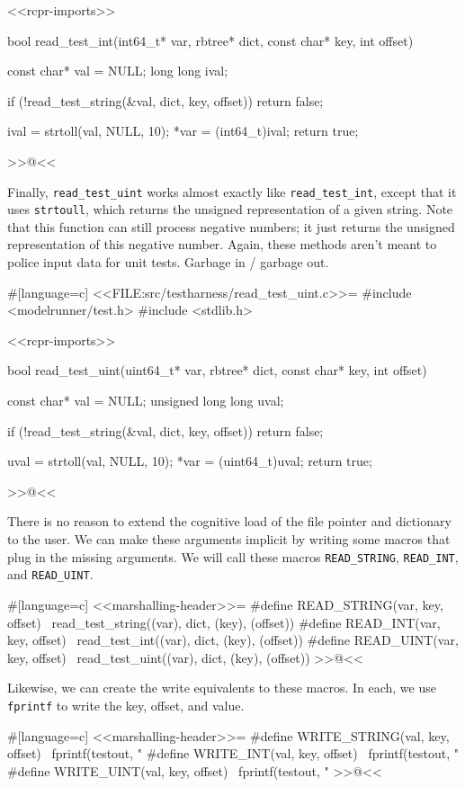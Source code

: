 {<<rcpr-imports>>

bool read_test_int(int64_t* var, rbtree* dict, const char* key, int offset)
{
    const char* val = NULL;
    long long ival;

    if (!read_test_string(&val, dict, key, offset))
    {
        return false;
    }

    ival = strtoll(val, NULL, 10);
    *var = (int64_t)ival;
    return true;
}
>>@<<

Finally, \verb/read_test_uint/ works almost exactly like \verb/read_test_int/,
except that it uses \verb/strtoull/, which returns the unsigned representation
of a given string. Note that this function can still process negative numbers;
it just returns the unsigned representation of this negative number. Again,
these methods aren't meant to police input data for unit tests. Garbage in /
garbage out.

#[language=c]
<<FILE:src/testharness/read_test_uint.c>>=
#include <modelrunner/test.h>
#include <stdlib.h>

<<rcpr-imports>>

bool read_test_uint(uint64_t* var, rbtree* dict, const char* key, int offset)
{
    const char* val = NULL;
    unsigned long long uval;

    if (!read_test_string(&val, dict, key, offset))
    {
        return false;
    }

    uval = strtoll(val, NULL, 10);
    *var = (uint64_t)uval;
    return true;
}
>>@<<

\newpage

There is no reason to extend the cognitive load of the file pointer and
dictionary to the user. We can make these arguments implicit by writing some
macros that plug in the missing arguments. We will call these macros
\verb/READ_STRING/, \verb/READ_INT/, and \verb/READ_UINT/.

#[language=c]
<<marshalling-header>>=
#define READ_STRING(var, key, offset) \
    read_test_string((var), dict, (key), (offset))
#define READ_INT(var, key, offset) \
    read_test_int((var), dict, (key), (offset))
#define READ_UINT(var, key, offset) \
    read_test_uint((var), dict, (key), (offset))
>>@<<

Likewise, we can create the write equivalents to these macros. In each, we use
\verb/fprintf/ to write the key, offset, and value.

#[language=c]
<<marshalling-header>>=
#define WRITE_STRING(val, key, offset) \
    fprintf(testout, "%
#define WRITE_INT(val, key, offset) \
    fprintf(testout, "%
#define WRITE_UINT(val, key, offset) \
    fprintf(testout, "%
>>@<<

}
